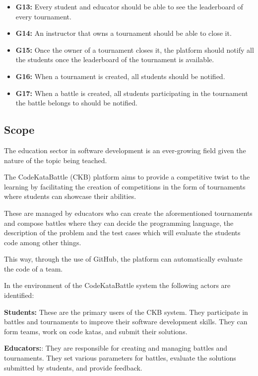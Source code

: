 \documentclass{article}
\begin{document}
\begin{itemize}
    \item \textbf{G13:} Every student and educator should be able to see the leaderboard of every tournament.
    \item \textbf{G14:} An instructor that owns a tournament should be able to close it.
    \item \textbf{G15:} Once the owner of a tournament closes it, the platform should notify all the students once the leaderboard of the tournament is available.
    \item \textbf{G16:} When a tournament is created, all students should be notified. 
    \item \textbf{G17:} When a battle is created, all students participating in the tournament the battle belongs to should be notified.
\end{itemize}

\newpage

\subsection{Scope}  

The education sector in software development is an ever-growing field given the nature of the topic 
being teached. 

The CodeKataBattle (CKB) platform aims to provide a competitive twist to the learning
by facilitating the creation of competitions in the form of tournaments where students can showcase their abilities.

These are managed by educators who can create the aforementioned tournaments and compose battles where they can decide 
the programming language, the description of the problem and the test cases which will evaluate the students code among other things.

This way, through the use of GitHub, the platform can automatically evaluate the code of a team.

In the environment of the CodeKataBattle system the following actors are identified:

\textbf{Students:} These are the primary users of the CKB system. They participate in battles and tournaments to improve their software development skills. They can form teams, work on code katas, and submit their solutions.

\textbf{Educators:}: They are responsible for creating and managing battles and tournaments. They set various parameters for battles, evaluate the solutions submitted by students, and provide feedback.
\end{document}

